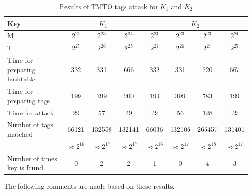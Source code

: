 \begin{table}[h!]
\begin{flushleft}
\small{
\begin{tabular}{|p{2.5cm}||c|c|c||c|c|c|c|}
\hline
Key & \multicolumn{3}{c||}{\textbf{$K_1$}} & \multicolumn{4}{c|}{\textbf{$K_2$}} \\ \hline \hline
M																&	$2^{23}$ 	&	$2^{23}$ 	&	$2^{24}$ 	&	$2^{23}$ 	&	$2^{23}$ 	&	$2^{23}$	&	$2^{24}$ 	\\ \hline
T	  														&	$2^{25}$ 	&	$2^{26}$ 	&	$2^{25}$ 	&	$2^{25}$	&	$2^{26}$ 	&	$2^{27}$	&	$2^{25}$ 	\\ \hline
Time for preparing hashtable		&	332				&	331				&	666				&	332				&	331 			&	320				&	667				\\ \hline
Time for preparing tags					&	199				&	399				&	200				&	199				&	399				&	783				&	199				\\ \hline
Time for attack									&	29 				&	57 				&	29				&	29  			&	56				&	128				& 29				\\ \hline
Number of tags matched 					&	66121			&	132559		&	132141		&	66036			&	132106		&	265457		& 131401		\\
																&$\approx 2^{16}$&	$\approx 2^{17}$&	$\approx 2^{17}$&	$\approx 2^{16}$&	$\approx 2^{17}$&	$\approx 2^{18}$ &	$\approx 2^{17}$	\\ \hline
Number of times key is found		&	0 				&	2 				&	2 				&	1 				&	0 				&	4			& 3		\\ \hline
\end{tabular}}
\end{flushleft}
\caption{Results of TMTO tags attack for $K_1$ and $K_2$}
\label{tab:tags-attack-results}
\end{table}

The following comments are made based on these results. 

